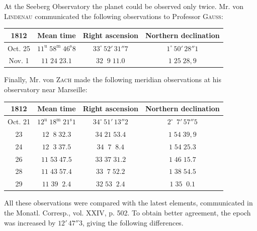 \par\indent At the Seeberg Observatory the planet could be observed only twice. Mr. von \textsc{Lindenau} communicated the following observations to Professor \textsc{Gauss}:

\begin{center}
\fontsize{10}{12}\selectfont\setlength{\tabcolsep}{4pt}\renewcommand{\arraystretch}{1.15}\begin{tabular}{|c|c|c|c|}
\hline
1812 & Mean time & Right ascension & Northern declination \\
\hline
Oct. 25 & $11^{\mathrm u}\;58^{\mathrm m}\;46^{\mathrm s}8$ & $33^\circ\,52'\,31''7$ & $1^\circ\,50'\,28''1$ \\
Nov. 1 & $11\;24\;23.1$ & $32\;\;9\;11.0$ & $1\;25\;28{,}9$ \\
\hline
\end{tabular}
\end{center}

\par\indent Finally, Mr. von \textsc{Zach} made the following meridian observations at his observatory near Marseille:

\begin{center}
\fontsize{10}{12}\selectfont\setlength{\tabcolsep}{4pt}\renewcommand{\arraystretch}{1.15}\begin{tabular}{|c|c|c|c|}
\hline
1812 & Mean time & Right ascension & Northern declination \\
\hline
Oct. 21 & $12^{\mathrm u}\;18^{\mathrm m}\;21^{\mathrm s}1$ & $34^\circ\,51'\,13''2$ & $2^\circ\,\;7'\,57''5$ \\
23 & $12\;\;8\;32.3$ & $34\;21\;53.4$ & $1\;54\;39{,}9$ \\
24 & $12\;\;3\;37.5$ & $34\;\;7\;\;8.4$ & $1\;54\;25.3$ \\
26 & $11\;53\;47.5$ & $33\;37\;31.2$ & $1\;46\;15.7$ \\
28 & $11\;43\;57.4$ & $33\;\;7\;52.2$ & $1\;38\;54.5$ \\
29 & $11\;39\;\;2.4$ & $32\;53\;\;2.4$ & $1\;35\;\;0.1$ \\
\hline
\end{tabular}
\end{center}

\par\indent All these observations were compared with the latest elements, communicated in the Monatl. Corresp., vol. XXIV, p. 502. To obtain better agreement, the epoch was increased by $12'\,47''3$, giving the following differences.

